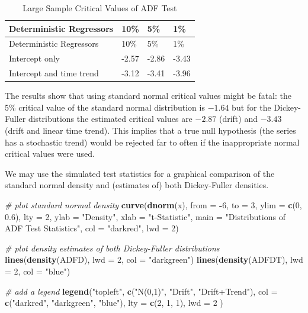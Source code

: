 \documentclass[]{book}
\newenvironment{Shaded}{\begin{snugshade}}{\end{snugshade}}
\newcommand{\KeywordTok}[1]{\textcolor[rgb]{0.13,0.29,0.53}{\textbf{#1}}}
\newcommand{\DataTypeTok}[1]{\textcolor[rgb]{0.13,0.29,0.53}{#1}}
\newcommand{\DecValTok}[1]{\textcolor[rgb]{0.00,0.00,0.81}{#1}}
\newcommand{\FloatTok}[1]{\textcolor[rgb]{0.00,0.00,0.81}{#1}}
\newcommand{\StringTok}[1]{\textcolor[rgb]{0.31,0.60,0.02}{#1}}
\newcommand{\CommentTok}[1]{\textcolor[rgb]{0.56,0.35,0.01}{\textit{#1}}}
\newcommand{\OperatorTok}[1]{\textcolor[rgb]{0.81,0.36,0.00}{\textbf{#1}}}
\newcommand{\NormalTok}[1]{#1}
\theoremstyle{definition}
\theoremstyle{definition}
\theoremstyle{definition}
\theoremstyle{remark}
\begin{document}
\begin{longtable}[]{@{}llll@{}}
\caption{\label{tab:DFcrits} Large Sample Critical Values of ADF
Test}\tabularnewline
\toprule
Deterministic Regressors & 10\% & 5\% & 1\%\tabularnewline
\midrule
\endfirsthead
\toprule
Deterministic Regressors & 10\% & 5\% & 1\%\tabularnewline
\midrule
\endhead
Intercept only & -2.57 & -2.86 & -3.43\tabularnewline
Intercept and time trend & -3.12 & -3.41 & -3.96\tabularnewline
\bottomrule
\end{longtable}

The results show that using standard normal critical values might be
fatal: the 5\% critical value of the standard normal distribution is
\(-1.64\) but for the Dickey-Fuller distributions the estimated critical
values are \(-2.87\) (drift) and \(-3.43\) (drift and linear time
trend). This implies that a true null hypothesis (the series has a
stochastic trend) would be rejected far to often if the inappropriate
normal critical values were used.

We may use the simulated test statistics for a graphical comparison of
the standard normal density and (estimates of) both Dickey-Fuller
densities.

\begin{Shaded}
\begin{Highlighting}[]
\CommentTok{# plot standard normal density}
\KeywordTok{curve}\NormalTok{(}\KeywordTok{dnorm}\NormalTok{(x), }
      \DataTypeTok{from =} \OperatorTok{-}\DecValTok{6}\NormalTok{, }\DataTypeTok{to =} \DecValTok{3}\NormalTok{, }
      \DataTypeTok{ylim =} \KeywordTok{c}\NormalTok{(}\DecValTok{0}\NormalTok{, }\FloatTok{0.6}\NormalTok{), }
      \DataTypeTok{lty =} \DecValTok{2}\NormalTok{,}
      \DataTypeTok{ylab =} \StringTok{"Density"}\NormalTok{,}
      \DataTypeTok{xlab =} \StringTok{"t-Statistic"}\NormalTok{,}
      \DataTypeTok{main =} \StringTok{"Distributions of ADF Test Statistics"}\NormalTok{,}
      \DataTypeTok{col =} \StringTok{"darkred"}\NormalTok{, }
      \DataTypeTok{lwd =} \DecValTok{2}\NormalTok{)}

\CommentTok{# plot density estimates of both Dickey-Fuller distributions}
\KeywordTok{lines}\NormalTok{(}\KeywordTok{density}\NormalTok{(ADFD), }\DataTypeTok{lwd =} \DecValTok{2}\NormalTok{, }\DataTypeTok{col =} \StringTok{"darkgreen"}\NormalTok{)}
\KeywordTok{lines}\NormalTok{(}\KeywordTok{density}\NormalTok{(ADFDT), }\DataTypeTok{lwd =} \DecValTok{2}\NormalTok{, }\DataTypeTok{col =} \StringTok{"blue"}\NormalTok{)}

\CommentTok{# add a legend}
\KeywordTok{legend}\NormalTok{(}\StringTok{"topleft"}\NormalTok{, }
       \KeywordTok{c}\NormalTok{(}\StringTok{"N(0,1)"}\NormalTok{, }\StringTok{"Drift"}\NormalTok{, }\StringTok{"Drift+Trend"}\NormalTok{),}
       \DataTypeTok{col =} \KeywordTok{c}\NormalTok{(}\StringTok{"darkred"}\NormalTok{, }\StringTok{"darkgreen"}\NormalTok{, }\StringTok{"blue"}\NormalTok{),}
       \DataTypeTok{lty =} \KeywordTok{c}\NormalTok{(}\DecValTok{2}\NormalTok{, }\DecValTok{1}\NormalTok{, }\DecValTok{1}\NormalTok{),}
       \DataTypeTok{lwd =} \DecValTok{2}
\NormalTok{       )}
\end{Highlighting}
\end{Shaded}
\end{document}
